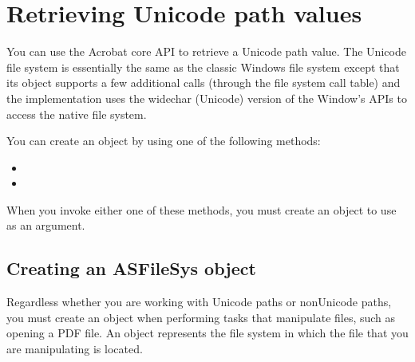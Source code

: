 \documentclass[letterpaper,12pt,english,openany,oneside]{sphinxmanual}
\begin{document}
\section{Retrieving Unicode path values}
\label{\detokenize{Plugins_Unicode:retrieving-unicode-path-values}}
You can use the Acrobat core API to retrieve a Unicode path value. The Unicode file system is essentially the same as the classic Windows file system except that its  object supports a few additional calls (through the file system call table) and the implementation uses the wide\sphinxhyphen{}char (Unicode) version of the Window’s APIs to access the native file system.

You can create an  object by using one of the following methods:
\begin{itemize}
\item {} 

\item {} 

\end{itemize}

When you invoke either one of these methods, you must create an  object to use as an argument.


\subsection{Creating an ASFileSys object}
\label{\detokenize{Plugins_Unicode:creating-an-asfilesys-object}}
Regardless whether you are working with Unicode paths or non\sphinxhyphen{}Unicode paths, you must create an  object when performing tasks that manipulate files, such as opening a PDF file. An  object represents the file system in which the file that you are manipulating is located.
\end{document}
